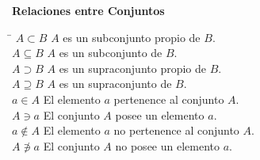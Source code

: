 \documentclass[11pt,letterpaper,twoside]{report}%
\begin{document}
{\bf Relaciones entre Conjuntos}
\begin{tabbing}
\hspace{\hdiml} \= \hspace{\hdim} \kill
$A\subset B$         \> $A$ es un subconjunto propio de $B$.\\[\lsk]
$A\subseteq B$       \> $A$ es un subconjunto de $B$.\\[\lsk]
$A\supset B$         \> $A$ es un supraconjunto propio de $B$.\\[\lsk]
$A\supseteq B$       \> $A$ es un supraconjunto de $B$.\\[\lsk]
$a\in A$       \> El elemento $a$ pertenence al conjunto $A$.\\[\lsk]
$A\ni a$       \> El conjunto $A$ posee un elemento $a$.\\[\lsk]
$a\notin A$       \> El elemento $a$ no pertenence al conjunto $A$.\\[\lsk]
$A\not\ni a$       \> El conjunto $A$ no posee un elemento $a$.\\[\lsk]
\end{tabbing}
\end{document}
